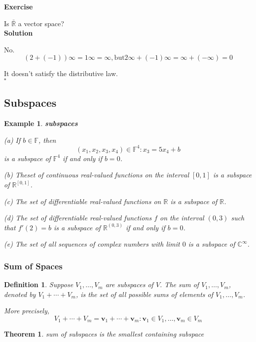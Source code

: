 \documentclass{article}
\newtheorem{theorem}{Theorem}[subsection]
\newtheorem{example}{Example}[subsection]
\newtheorem{definition}{Definition}[subsection]
\newenvironment{exercise}{%
{\textbf{Exercise\\}
    }
}{
}
\newenvironment{solution}{%
{
    \textbf{Solution\\}
    }
}{
  \hfill $\square$ 
  \par\bigskip 
}
\newcommand{\RR}{\mathbb{R}}
\newcommand{\CC}{\mathbb{C}}
\newcommand{\FF}{\mathbb{F}}
\newcommand{\ve}{\boldsymbol}
\begin{document}
\begin{CJK}{UTF8}{gkai}
\begin{exercise}
Is $\bar{\RR}$ a vector space?\\

\end{exercise}
\begin{solution}
No. \[(2 + (-1)) \infty = 1 \infty = \infty , \text{but} 2 \infty + (-1) \infty = \infty + (-\infty) = 0\]

It doesn't satisfy the distributive law.\\
\end{solution}


\subsection{Subspaces}

\begin{example}
    \textbf{subspaces}

    (a) If $b \in \FF$, then
    \[{(x_1, x_2, x_3, x_4) \in \FF^4 : x_3 = 5x_4 + b}\]
    is a subspace of $\FF^4$ if and only if $b = 0$.

    (b) Theset of continuous real-valued functions on the interval $[0,1]$ is a subspace
    of $\RR^{[0,1]}$.

    (c) The set of differentiable real-valued functions on $\RR$ is a subspace of $\RR$.

    (d) The set of differentiable real-valued functions $f$ on the interval $(0,3)$ such
    that $f'(2) = b$ is a subspace of $\RR^{(0,3)}$ if and only if $b = 0$.

    (e) The set of all sequences of complex numbers with limit $0$ is a subspace of $\CC^\infty$.
\end{example}

\subsubsection{Sum of Spaces}

\begin{definition}
    Suppose $V_1,\ldots,V_m$ are subspaces of $V$. The sum of $V_1,\ldots,V_m$, denoted by
 $V_1 +\cdots+V_m$, is the set of all possible sums of elements of $V_1, \ldots, V_m$. 

 More precisely,
 \[V_1 +\cdots+V_m ={\ve{v}_1 + \cdots + \ve{v}_m :\ve{v}_1 \in V_1,\ldots,\ve{v}_m \in V_m}\]
\end{definition}

\begin{theorem}
    sum of subspaces is the smallest containing subspace\\


\end{theorem}
\end{CJK}
\end{document}
